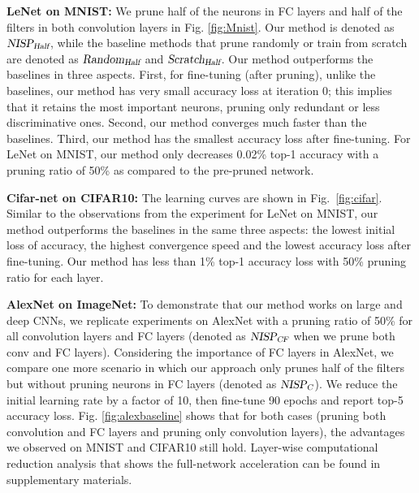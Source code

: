 \documentclass[10pt,twocolumn,letterpaper]{article}
\begin{document}
\textbf{LeNet on MNIST:}
We prune half of the neurons in FC layers and half of the filters in both convolution layers in Fig. \ref{fig:Mnist}. Our method is denoted as $\textsl{NISP}_\textsl{Half}$, while the baseline methods that prune randomly or train from scratch are denoted as $\textsl{Random}_\textsl{Half}$ and $\textsl{Scratch}_\textsl{Half}$. 
Our method outperforms the baselines in three aspects.
First, for fine-tuning (after pruning), unlike the baselines, our method has very small accuracy loss at iteration 0; this implies that it retains the most important neurons, pruning only redundant or less discriminative ones.
Second, our method converges much faster than the baselines.
Third, our method has the smallest accuracy loss after fine-tuning. 
For LeNet on MNIST, our method only decreases 0.02\% top-1 accuracy with a pruning ratio of 50\% as compared to the pre-pruned network.

\textbf{Cifar-net on CIFAR10:}
The learning curves are shown in Fig.~\ref{fig:cifar}. 
Similar to the observations from the experiment for LeNet on MNIST, our method outperforms the baselines in the same three aspects: the lowest initial loss of accuracy, the highest convergence speed and the lowest accuracy loss after fine-tuning. Our method has less than 1\% top-1 accuracy loss with 50\% pruning ratio for each layer.

\textbf{AlexNet on ImageNet:}
To demonstrate that our method works on large and deep CNNs, we replicate experiments on AlexNet with a pruning ratio of 50\% for all convolution layers and FC layers (denoted as {$\textsl{NISP}_\textsl{CF}$} when we prune both conv and FC layers). 
Considering the importance of FC layers in AlexNet, we compare one more scenario in which our approach only prunes half of the filters but without pruning neurons in FC layers (denoted as $\textsl{NISP}_\textsl{C}$).
We reduce the initial learning rate by a factor of 10, then fine-tune 90 epochs and report top-5 accuracy loss.
Fig. \ref{fig:alexbaseline} shows that for both cases (pruning both convolution and FC layers and pruning only convolution layers), the advantages we observed on MNIST and CIFAR10 still hold. 
Layer-wise computational reduction analysis that shows the full-network acceleration can be found in supplementary materials.
\end{document}
